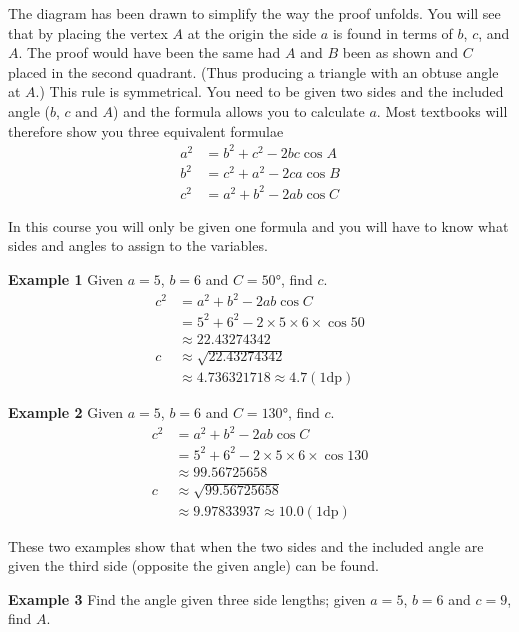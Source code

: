 The diagram has been drawn to simplify the way the proof unfolds. You will see that by placing the vertex $A$ at the origin the side $a$ is found in terms of $b$, $c$, and $A$. The proof would have been the same had $A$ and $B$ been as shown and $C$ placed in the second quadrant. (Thus producing a triangle with an obtuse angle at $A$.) This rule is symmetrical. You need to be given two sides and the included angle ($b$, $c$ and $A$) and the formula allows you to calculate $a$. Most textbooks will therefore show you three equivalent formulae
\begin{align*}a^{2} &  = b^{2} +c^{2} -2 b c \cos  A \\
b^{2} &  = c^{2} +a^{2} -2 c a \cos  B \\
c^{2} &  = a^{2} +b^{2} -2 a b \cos  C\end{align*}

In this course you will only be given one formula and you will have to know what sides and angles to assign to the variables. 

\textbf{Example 1}
Given $a =5$, $b =6$ and $C =\ang{50} $, find $c$.
\begin{align*}c^{2} &  = a^{2} +b^{2} -2 a b \cos  C \\
&  = 5^{2} +6^{2} -2 \times 5 \times 6 \times \cos  50  \\
&  \approx   22.43274342 \\
c &  \approx   \sqrt{22.43274342} \\
&  \approx   4.736321718 \approx 4.7 \left (1\text{dp}\right )\end{align*}

\textbf{Example 2}
Given $a =5$, $b =6$ and $C =\ang{130} $, find $c$.
\begin{align*}c^{2} &  = a^{2} +b^{2} -2 a b \cos  C \\
&  = 5^{2} +6^{2} -2 \times 5 \times 6 \times \cos  130  \\
&  \approx   99.56725658 \\
c &  \approx   \sqrt{99.56725658} \\
&  \approx   9.97833937 \approx 10.0 \left (1\text{dp}\right )\end{align*}

These two examples show that when the two sides and the included angle are given the third side
(opposite the given angle) can be found. 

\textbf{Example 3} Find the angle given three side lengths; given $a =5$, $b =6$ and $c =9$, find $A$. 

